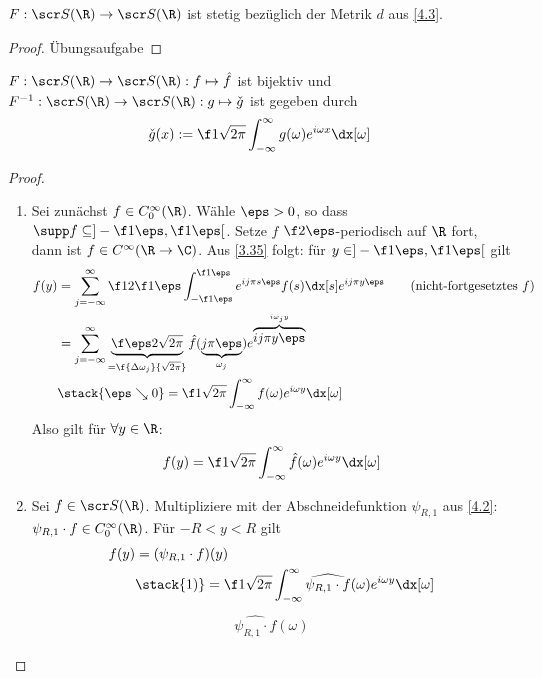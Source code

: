 \begin{nt} \label{4.9}
	$F : \scr S(\R) \to \scr S(\R)$ ist stetig bezüglich der Metrik $d$ aus \ref{4.3}.
	\begin{proof}
		Übungsaufgabe 
	\end{proof}
\end{nt}

\begin{st} \label{4.10}
	$F: \scr S(\R) \to \scr S(\R): f \mapsto \hat f$ ist bijektiv und $F^{-1}: \scr S(\R) \to \scr S(\R) : g \mapsto \check g$ ist gegeben durch
	\[
		\check g(x) := \f 1{\sqrt{2\pi}} \int_{-\infty}^\infty g(\omega) e^{i \omega x} \dx[\omega]
	\]
	\begin{proof}
		\begin{enumerate}[1)]
			\item
				Sei zunächst $f \in C_0^\infty(\R)$.
				Wähle $\eps > 0$, so dass $\supp f \subset ]-\f 1\eps, \f 1\eps[$.
				Setze $f$ $\f 2\eps$-periodisch auf $\R$ fort, dann ist $f \in C^\infty (\R \to \C)$.
				Aus \ref{3.35} folgt: für $y \in ]-\f 1\eps, \f 1\eps[$ gilt
				\begin{align*}
					f(y) 
					&= \sum_{j=-\infty}^\infty \f 1{2 \f 1\eps} \int_{-\f 1\eps}^{\f 1\eps} e^{ij\pi s \eps} f(s) \dx[s] e^{ij\pi y \eps} \qquad \text{(nicht-fortgesetztes $f$)}\\
					&= \sum_{j=-\infty}^\infty \underbrace{\f \eps 2 \sqrt{2\pi}}_{= \f {\Delta \omega_j}{\sqrt{2\pi}}} \hat f(\underbrace{j\pi \eps}_{\omega_j}) e^{\overbrace{ij\pi y \eps}^{i\omega_j y}} \\
					&\stack{\eps \searrow 0}= \f 1{\sqrt{2\pi}} \int_{-\infty}^\infty f(\omega) e^{i\omega y} \dx[\omega]
				\end{align*}
				Also gilt für $\forall y \in \R$:
				\[
					f(y) = \f 1{\sqrt{2\pi}} \int_{-\infty}^\infty \hat f(\omega) e^{i \omega y} \dx[\omega]
				\]
			\item
				Sei $f \in \scr S(\R)$.
				Multipliziere mit der Abschneidefunktion $\psi_{R,1}$ aus \ref{4.2}: $\psi_{R,1}\cdot f \in C_0^\infty(\R)$.
				Für $-R < y < R$ gilt
				\begin{align*}
					f(y) 
					&= (\psi_{R,1}\cdot f)(y) \\
					&\stack{1)}= \f 1{\sqrt{2\pi}} \int_{-\infty}^\infty \widehat{\psi_{R,1} \cdot f}(\omega) e^{i\omega y} \dx[\omega]
				\end{align*}
				\begin{align*}
					\widehat{\psi_{R,1} \cdot f}(\omega) 

\end{align*}
\end{enumerate}
\end{proof}
\end{st}
